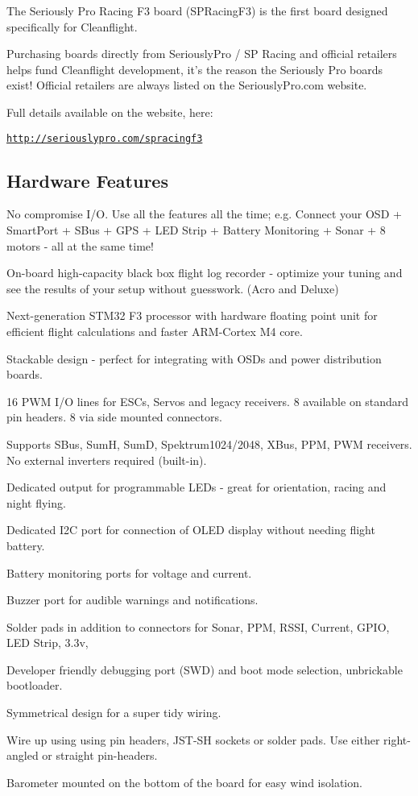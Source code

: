 The Seriously Pro Racing F3 board (S\+P\+Racing\+F3) is the first board designed specifically for Cleanflight.

Purchasing boards directly from Seriously\+Pro / S\+P Racing and official retailers helps fund Cleanflight development, it's the reason the Seriously Pro boards exist! Official retailers are always listed on the Seriously\+Pro.\+com website.

Full details available on the website, here\+:

\href{http://seriouslypro.com/spracingf3}{\tt http\+://seriouslypro.\+com/spracingf3}

\subsection*{Hardware Features}


\begin{DoxyItemize}
\item No compromise I/\+O. Use all the features all the time; e.\+g. Connect your O\+S\+D + Smart\+Port + S\+Bus + G\+P\+S + L\+E\+D Strip + Battery Monitoring + Sonar + 8 motors -\/ all at the same time!
\item On-\/board high-\/capacity black box flight log recorder -\/ optimize your tuning and see the results of your setup without guesswork. (Acro and Deluxe)
\item Next-\/generation S\+T\+M32 F3 processor with hardware floating point unit for efficient flight calculations and faster A\+R\+M-\/\+Cortex M4 core.
\item Stackable design -\/ perfect for integrating with O\+S\+Ds and power distribution boards.
\item 16 P\+W\+M I/\+O lines for E\+S\+Cs, Servos and legacy receivers. 8 available on standard pin headers. 8 via side mounted connectors.
\item Supports S\+Bus, Sum\+H, Sum\+D, Spektrum1024/2048, X\+Bus, P\+P\+M, P\+W\+M receivers. No external inverters required (built-\/in).
\item Dedicated output for programmable L\+E\+Ds -\/ great for orientation, racing and night flying.
\item Dedicated I2\+C port for connection of O\+L\+E\+D display without needing flight battery.
\item Battery monitoring ports for voltage and current.
\item Buzzer port for audible warnings and notifications.
\item Solder pads in addition to connectors for Sonar, P\+P\+M, R\+S\+S\+I, Current, G\+P\+I\+O, L\+E\+D Strip, 3.\+3v,
\item Developer friendly debugging port (S\+W\+D) and boot mode selection, unbrickable bootloader.
\item Symmetrical design for a super tidy wiring.
\item Wire up using using pin headers, J\+S\+T-\/\+S\+H sockets or solder pads. Use either right-\/angled or straight pin-\/headers.
\item Barometer mounted on the bottom of the board for easy wind isolation.
\end{DoxyItemize}

